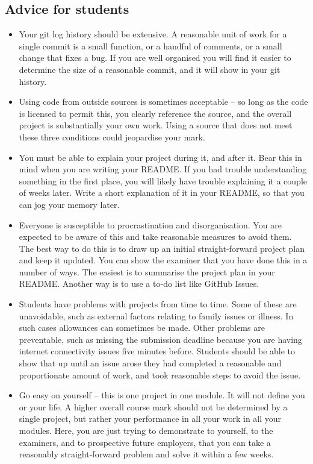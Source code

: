 \documentclass[12pt, a4paper]{article}
\begin{document}
\subsection*{Advice for students}
\begin{itemize}
    \item
    Your git log history should be extensive.
    A reasonable unit of work for a single commit is a small function, or a handful of comments, or a small change that fixes a bug.
    If you are well organised you will find it easier to determine the size of a reasonable commit, and it will show in your git history.
    \item
    Using code from outside sources is sometimes acceptable -- so long as the code is licensed to permit this, you clearly reference the source, and the overall project is substantially your own work.
    Using a source that does not meet these three conditions could jeopardise your mark.
    \item
    You must be able to explain your project during it, and after it.
    Bear this in mind when you are writing your README.
    If you had trouble understanding something in the first place, you will likely have trouble explaining it a couple of weeks later.
    Write a short explanation of it in your README, so that you can jog your memory later.
    \item
    Everyone is susceptible to procrastination and disorganisation.
    You are expected to be aware of this and take reasonable measures to avoid them.
    The best way to do this is to draw up an initial straight-forward project plan and keep it updated.
    You can show the examiner that you have done this in a number of ways.
    The easiest is to summarise the project plan in your README.
    Another way is to use a to-do list like GitHub Issues.
    \item
    Students have problems with projects from time to time.
    Some of these are unavoidable, such as external factors relating to family issues or illness.
    In such cases allowances can sometimes be made.
    Other problems are preventable, such as missing the submission deadline because you are having internet connectivity issues five minutes before.
    Students should be able to show that up until an issue arose they had completed a reasonable and proportionate amount of work, and took reasonable steps to avoid the issue.
    \item
    Go easy on yourself -- this is one project in one module.
    It will not define you or your life.
    A higher overall course mark should not be determined by a single project, but rather your performance in all your work in all your modules.
    Here, you are just trying to demonstrate to yourself, to the examiners, and to prospective future employers, that you can take a reasonably straight-forward problem and solve it within a few weeks.
\end{itemize}




\end{document}
